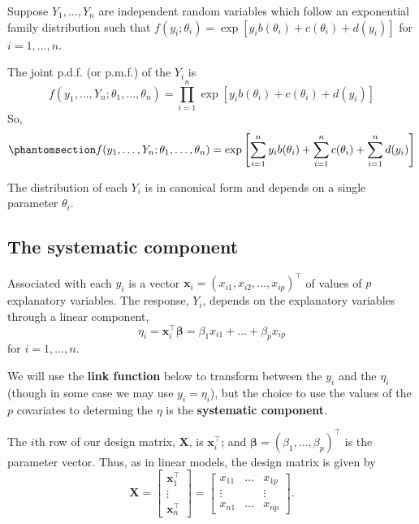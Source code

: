 \documentclass[
  a4paper,
  DIV=11,
  numbers=noendperiod]{scrreprt}
\newcommand{\term}[1]{\textbf{#1}}
\begin{document}
Suppose \(Y_1,\dots, Y_n\) are independent random variables which follow
an exponential family distribution such that
\(f(y_i; \theta_i)=\exp[y_i b(\theta_i)+c(\theta_i)+d(y_i)]\) for
\(i=1,\dots,n\).

The joint p.d.f. (or p.m.f.) of the \(Y_i\) is \[
f(y_1,\dots,Y_n; \theta_1,\dots, \theta_n) =
  \prod_{i=1}^n \exp[y _i b(\theta_i)+c(\theta_i)+d(y_i)]
\] So, \begin{equation}\phantomsection\label{eq-joint}{
f(y_1,\dots,Y_n; \theta_1,\dots, \theta_n) = \exp \left[ \sum_{i=1}^n y_i b(\theta_i)+ \sum_{i=1}^n c(\theta_i) +\sum_{i=1}^n d(y_i) \right]
}\end{equation}

The distribution of each \(Y_i\) is in canonical form and depends on a
single parameter \(\theta_i\).

\subsection{\texorpdfstring{The \term{systematic
component}}{The systematic component}}\label{the-systematic-component}

Associated with each \(y_i\) is a vector
\(\boldsymbol{x}_i=(x_{i1},x_{i2},\dots,x_{ip})^\intercal\) of values of
\(p\) explanatory variables. The response, \(Y_i\), depends on the
explanatory variables through a linear component, \[
\eta_i=\boldsymbol{x}_i^{\intercal} \boldsymbol{\beta}=\beta_1x_{i1}+\dots + \beta_p x_{ip}
\] for \(i=1,\dots, n.\)

We will use the \term{link function} below to transform between the
\(y_i\) and the \(\eta_i\) (though in some case we may use
\(y_i=\eta_i\)), but the choice to use the values of the \(p\)
covariates to determing the \(\eta\) is the \term{systematic component}.

The \(i\)th row of our design matrix, \(\boldsymbol{X}\), is
\(\boldsymbol{x}_i^{\intercal}\); and
\(\boldsymbol{\beta}=(\beta_1,\dots, \beta_p)^\intercal\) is the
parameter vector. Thus, as in linear models, the design matrix is given
by
\[\boldsymbol{X} = \left[ \begin{array}{c} \boldsymbol{x}_1^\intercal \\ \vdots \\ \boldsymbol{x}_n^\intercal \end{array}\right] =  \left[ \begin{array}{ccc} x_{11} & \dots & x_{1p} \\ \vdots & & \vdots \\ x_{n1} & \dots & x_{np}  \end{array}\right].\]
\end{document}
